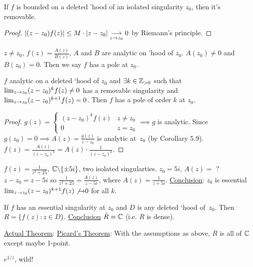 \documentclass[]{article}
\begin{document}
\begin{corollary}
	If $f$ is bounded on a deleted 'hood of an isolated singularity $z_0$, then it's removable.
\end{corollary}
\begin{proof}
	$|(z-z_0)f(z)|\leq M \cdot |z-z_0| \underset{z\rightarrow z_0}{\longrightarrow} 0$ by Riemann's principle.
\end{proof}
\begin{definition}
	$z\neq z_0$, $f(z) = \frac{A(z)}{B(z)}$, $A$ and $B$ are analytic on 'hood of $z_0$. $A(z_0) \neq 0$ and $B(z_0) = 0$. Then we say $f$ has a pole at $z_0$.
\end{definition}
\begin{theorem}
	$f$ analytic on a deleted `hood of $z_0$ and $\exists k \in\mathbb{Z}_{>0}$ such that $\lim_{z\rightarrow z_0} (z-z_0)^k f(z) \neq 0$ has a removable singularity and $\lim_{z\rightarrow z_0} (z-z_0)^{k+1} f(z) = 0$. Then $f$ has a pole of order $k$ at $z_0$.
\end{theorem}
\begin{proof}
	$g(z) = \begin{cases} (z-z_0)^k f(z) & z\neq z_0 \\ 0 & z=z_0 \end{cases} \implies g$ is analytic. Since $g(z_0) = 0 \implies A(z) = \frac{g(z)}{z-z_0}$ is analytic at~$z_0$ (by Corollary 5.9). $f(z) = \frac{A(z)}{(z-z_0)^k} = A(z) \cdot \frac{1}{(z-z_0)^k}$.
\end{proof}
\begin{example}
	$f(z) = \frac{1}{z^2 + 25}$, $\mathbb{C}\backslash \{\pm 5i\}$, two isolated singularties. $z_0 = 5i$, $A(z) = $ ? $z-z_0 = z-5i$ so $\frac{1}{z^2+25} = \frac{A(z)}{z-5i}$, where $A(z) = \frac{1}{z+5i}$. \underline{Conclusion}: $z_0$ is essential $\lim_{z\rightarrow z_0} (z-z_0)^{k+1} f(z) \not{\rightarrow} 0$ for all $k$.
\end{example}
\begin{theorem}
	 If $f$ has an essential singularity at $z_0$ and $D$ is any deleted `hood of~$z_0$. Then $R = \{f(z): z\in D\}$. \underline{Conclusion} $\bar{R} = \mathbb{C}$ (i.e. $R$ is dense).
\end{theorem}
\underline{Actual Theorem}: \underline{Picard's Theorem}: With the assumptions as above, $R$ is all of $\mathbb{C}$ except maybe 1-point.
\begin{example}
	$e^{1/z}$, wild!
\end{example}
\end{document}

